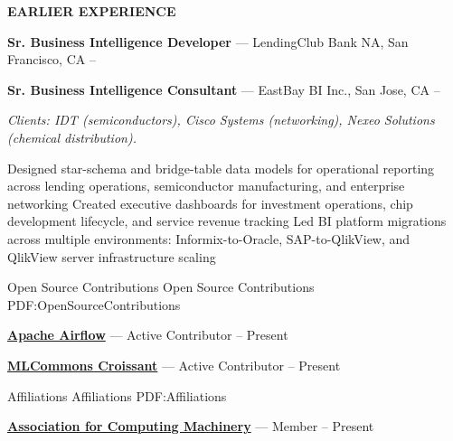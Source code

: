 \documentclass[letterpaper,MMMyyyy,nonstopmode]{simpleresumecv}
\newcommand{\CompanyName}[1]{{\fontsize{10pt}{12pt}\selectfont\bfseries\MakeUppercase{#1}}}
\begin{document}
\begin{Body}
\endgroup

\BigGap

\par{}%
\CompanyName{Earlier Experience}

\Gap

\begingroup
\textbf{Sr. Business Intelligence Developer} --- LendingClub Bank NA, San Francisco, CA
\hfill
{} --

\textbf{Sr. Business Intelligence Consultant} --- EastBay BI Inc., San Jose, CA
\hfill
{} --

\Entry
\textit{Clients: IDT (semiconductors), Cisco Systems (networking), Nexeo Solutions (chemical distribution).}

\BulletItem Designed star-schema and bridge-table data models for operational reporting across lending operations, semiconductor manufacturing, and enterprise networking
\BulletItem Created executive dashboards for investment operations, chip development lifecycle, and service revenue tracking
\BulletItem Led BI platform migrations across multiple environments: Informix-to-Oracle, SAP-to-QlikView, and QlikView server infrastructure scaling
\endgroup

\BigGap


\Section
{Open Source\newline
Contributions}
{Open Source Contributions}
{PDF:OpenSourceContributions}

\Entry
\href{https://github.com/apache/airflow}
{\textbf{Apache Airflow}} --- Active Contributor
\hfill
{} --
Present

\Gap

\Entry
\href{https://github.com/mlcommons/croissant}
{\textbf{MLCommons Croissant}} --- Active Contributor
\hfill
{} --
Present

\BigGap


\Section
{Affiliations}
{Affiliations}
{PDF:Affiliations}

\Entry
\href{https://www.acm.org/}
{\textbf{Association for Computing Machinery}} --- Member
\hfill
{} --
Present


\end{Body}
\end{document}
